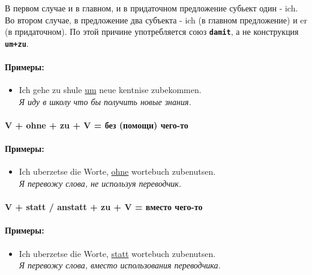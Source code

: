 \documentclass[12pt,a4paper]{report}
\newcommand{\term}[1]{\texttt{\textbf{#1}}}
\newcommand{\satzew}[1]{\underline{#1}}
\newcommand{\ubersatze}[1]{\textit{#1}}
\begin{document}
В первом случае и в главном, и в придаточном предложение субьект один - ich. Во втором случае, в предложение два субъекта - ich (в главном предложение) и er (в придаточном). По этой причине употребляется союз \term{damit}, а не конструкция \term{um+zu}.

\paragraph{Примеры:}
\begin{itemize}
\item Ich gehe zu shule \satzew{um} neue kentnise zubekommen.
~\\ \ubersatze{Я иду в школу что бы получить новые знания.}
\end{itemize}

\paragraph{V + ohne + zu + V = без (помощи) чего-то}

\paragraph{Примеры:}
\begin{itemize}
\item Ich uberzetse die Worte, \satzew{ohne} wortebuch zubenutsen.
~\\ \ubersatze{Я перевожу слова, не используя переводчик.}
\end{itemize}

\paragraph{V + statt / anstatt + zu + V = вместо чего-то}

\paragraph{Примеры:}
\begin{itemize}
\item Ich uberzetse die Worte, \satzew{statt} wortebuch zubenutsen.
~\\ \ubersatze{Я перевожу слова, вместо использования переводчика.}
\end{itemize}
\end{document}
